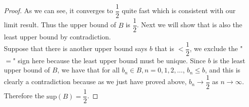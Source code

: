 \documentclass[10pt,letterpaper]{article}
\begin{document}
\begin{enumerate}[(i)]
\begin{proof}
	As we can see, it converges to $\dfrac{1}{2}$ quite fast which is consistent with our limit result. Thus 
	the upper bound of $B$ is $\dfrac{1}{2}$. Next we will show that is also the least upper bound by contradiction. \\
	Suppose that there is another upper bound says $b$ that is $< \dfrac{1}{2}$, we exclude the "$=$" sign here because the least upper bound
	must be unique. Since $b$ is the least upper bound of $B$, we have that for all $b_n \in B, n = 0, 1, 2, \ldots$, $b_n \leq b$, and this is clearly a contradiction
	because as we just have proved above, $b_n \rightarrow \dfrac{1}{2}$ as $n \rightarrow \infty$. Therefore the $\mathrm{sup}(B) = \dfrac{1}{2}$.
	\end{proof}
	\end{enumerate}
	
\end{document}
